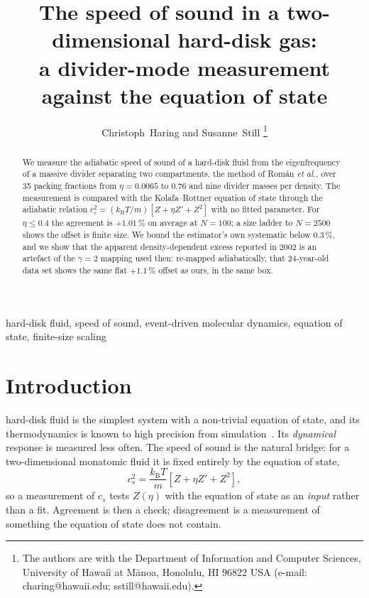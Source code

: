 \documentclass[journal]{IEEEtran}
\newcommand{\kT}{k_{\mathrm B}T}
\begin{document}
\title{The speed of sound in a two-dimensional hard-disk gas:\\
a divider-mode measurement against the equation of state}

\author{Christoph~Haring and Susanne~Still%
\thanks{The authors are with the Department of Information and Computer Sciences,
University of Hawai\`i at M\=anoa, Honolulu, HI 96822 USA
(e-mail: charing@hawaii.edu; sstill@hawaii.edu).}}

\maketitle

\begin{abstract}
We measure the adiabatic speed of sound of a hard-disk fluid from the eigenfrequency of a massive
divider separating two compartments, the method of Rom\'an \emph{et al.}, over 35 packing fractions
from $\eta = 0.0065$ to $0.76$ and nine divider masses per density. The measurement is compared with
the Kolafa--Rottner equation of state through the adiabatic relation
$c_s^2 = (\kT/m)[Z + \eta Z' + Z^2]$ with no fitted parameter. For $\eta \le 0.4$ the agreement is
$+1.01\,\%$ on average at $N = 100$; a size ladder to $N = 2500$ shows the offset is finite size. We
bound the estimator's own systematic below $0.3\,\%$, and we show that the apparent
density-dependent excess reported in 2002 is an artefact of the $\gamma = 2$ mapping used then:
re-mapped adiabatically, that 24-year-old data set shows the same flat $+1.1\,\%$ offset as ours,
in the same box.
\end{abstract}

\begin{IEEEkeywords}
hard-disk fluid, speed of sound, event-driven molecular dynamics, equation of state,
finite-size scaling
\end{IEEEkeywords}

\section{Introduction}
 hard-disk fluid is the simplest system with a non-trivial equation of state,
and its thermodynamics is known to high precision from simulation~\cite{kolafa2006}. Its
\emph{dynamical} response is measured less often. The speed of sound is the natural bridge: for a
two-dimensional monatomic fluid it is fixed entirely by the equation of state,
\begin{equation}
c_s^2 = \frac{\kT}{m}\left[Z + \eta Z' + Z^2\right],
\label{eq:adiabatic}
\end{equation}
so a measurement of $c_s$ tests $Z(\eta)$ with the equation of state as an \emph{input} rather than
a fit. Agreement is then a check; disagreement is a measurement of something the equation of state
does not contain.
\end{document}

